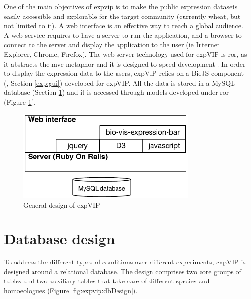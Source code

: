 One of the main objectives of \gls{expvip} is to make the public expression datasets easily accessible and explorable for the target community (currently wheat, but not limited to it). 
A web interface is an effective way to reach a global audience. 
A web service requires to have a server to run the application, and a browser to connect to the server and display the application to the user (ie Internet Explorer, Chrome, Firefox).
The web server technology used for expVIP is \acrshort{ror}, as it abstracts the \acrshort{mvc} metaphor and it is designed to speed development \citep{RailsGuide2016}. 
In order to display the expression data to the users,  expVIP relies on a BioJS component (\citealt{Yachdav2015}, Section \ref{exp:gui}) developed for expVIP. 
All the data is stored in a MySQL database (Section \ref{exp:DB}) and it is accessed through models developed under  \acrshort{ror} (Figure \ref{fig:poly:archDesign}).  

\begin{figure}[b] 
  \centering
  \includegraphics[width=0.8\textwidth]{expVIP/Figures/archDesign.pdf}
  \caption{General design of expVIP}
  \label{fig:poly:archDesign}
\end{figure}

\section{Database design} 
\label{exp:DB}

To address the different types of conditions over different experiments, expVIP is designed around a relational database. 
The design comprises two core groups of tables and two auxiliary tables that take care of different species and homoeologues (Figure \ref{fig:expvip:dbDesign}).


